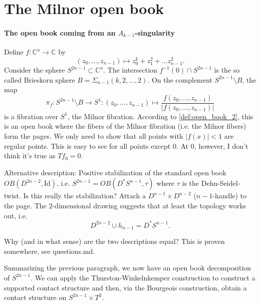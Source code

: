 \section*{The Milnor open book}

\paragraph*{The open book coming from an $A_{k-1}$-singularity}
Define $f\colon \mathbb C^n \to \mathbb C$ by
\[
    (z_0, \dots, z_{n-1}) \mapsto z_0^k + z_1^2 + \dots z_{n-1}^2.  
\]
Consider the sphere $S^{2n-1} \subset \mathbb C^n$.
The intersection $f^{-1}(0) \cap S^{2n-1}$ is the so called Brieskorn sphere $B = \Sigma_{n-1}(k,2,\dots,2)$.
On the complement $S^{2n-1} \setminus B$, the map
\[
    \pi_f\colon S^{2n-1}\setminus B \to S^1\colon (z_0, \dots, z_{n-1}) \mapsto \frac{f(z_0, \dots, z_{n-1})}{|f(z_0, \dots, z_{n-1})|}
\]
is a fibration over $S^1$, the Milnor fibration.
According to \cref{def:open_book_2}, this is an open book where the fibers of the Milnor fibration (i.e. the Milnor fibers) form the pages.
We only need to show that all points with $|f(x)| < 1$ are regular points.
This is easy to see for all points except $0$. 
At $0$, however, I don't think it's true as $Tf_0 = 0$.


Alternative description: Positive stabilization of the standard open book $OB(D^{2n-2}, \mathrm{Id})$,
i.e. $S^{2n-1} = OB(D^*S^{n-1}, \tau)$ where $\tau$ is the Dehn-Seidel-twist.
Is this really the stabilization?
Attach a $D^{n-1} \times D^{n-2}$ ($n-1$-handle) to the page.
The $2$-dimensional drawing suggests that at least the topology works out, i.e.
\[
    D^{2n-2} \cup h_{n-1} = D^*S^{n-1}.
\]

Why (and in what sense) are the two descriptions equal? This is proven somewhere, see questions.md.

Summarizing the previous paragraph, we now have an open book decomposition of $S^{2n-1}$.
We can apply the Thurston-Winkelnkemper construction to construct a supported contact structure
and then, via the Bourgeois construction, obtain a contact structure on $S^{2n-1} \times T^2$.